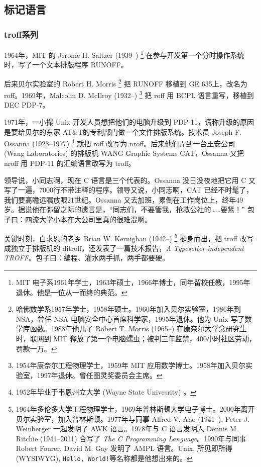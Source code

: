 \subsection{标记语言}

\subsubsection{troff系列}

1964年，MIT 的 Jerome H. Saltzer (1939--)\indexSaltzer{} \footnote{MIT 电子系1961年学士，1963年硕士，1966年博士，同年留校任教，1995年退休。他是一位从一而终的典范。} 在参与开发第一个分时操作系统时，写了一个文本排版程序 RUNOFF。

后来贝尔实验室\indexBell 的 Robert H. Morris\indexMorris{} \footnote{哈佛数学系1957年学士，1958年硕士。1960年加入贝尔实验室，1986年到 NSA，曾任 NSA 电脑安全中心首席科学家，1995年退休。他为 Unix 写了数学库函数。1988年他儿子 Robert T. Morris (1965--) 在康奈尔大学念研究生时，联网到 MIT 释放了第一个电脑蠕虫；被判三年监禁，400小时社区劳动，罚款一万。} 把 RUNOFF 移植到 GE 635上，改名为 roff。1969年，Malcolm D. McIlroy (1932--)\indexMcIlroy{} \footnote{1954年康奈尔工程物理学士，1959年 MIT 应用数学博士。1958年加入贝尔实验室，1997年退休。曾任图灵奖委员会主席。} 把 roff 用 BCPL 语言重写，移植到 DEC\indexDEC{} PDP-7。

1971年，一小撮 Unix 开发人员想把他们的电脑升级到 PDP-11，谎称升级的原因是要给贝尔的东家 AT\&T\indexATT 的专利部门做一个文件排版系统。技术员 Joseph F. Ossanna (1928--1977)\indexOssanna{} \footnote{1952年毕业于韦恩州立大学 (Wayne State Univesrity) 。} 就把 roff 改写为 nroff。后来他们弄到一台王安公司 (Wang Laboratories)\indexWangLabs{} 的排版机 WANG Graphic Systems CAT，Ossanna 又把 nroff 用 PDP-11 的汇编语言改写为 troff。

领导说，小同志啊，现在 C 语言是三个代表的。Ossanna 没日没夜地把它用 C 又写了一遍，7000行不带注释的程序。领导又说，小同志啊，CAT 已经不时髦了，我们要高瞻远瞩放眼21世纪。Ossanna 又去加班，累倒在工作岗位上，终年49岁。据说他在弥留之际的遗言是，“同志们，不要管我，抢救公社的……要紧！” 包子曰：四流大学小本在大公司里真的很难混啊。

关键时刻，白求恩的老乡 Brian W. Kernighan (1942--)\indexKernighan{} \footnote{1964年多伦多大学工程物理学士，1969年普林斯顿大学电子博士。2000年离开贝尔实验室，加入普林斯顿。1977年与同事 Alfred V. Aho (1941--), Peter J. Weinberger 一起发明了 AWK 语言。1978年与 C 语言发明人 Dennis M. Ritchie (1941--2011) 合写了 \emph{The C Programming Language}。1990年与同事 Robert Fourer, David M. Gay 发明了 AMPL 语言。Unix, 所见即所得 (WYSIWYG), \texttt{Hello, World!}等名称都是他想出来的。} 挺身而出，把 troff 改写成独立于排版机的 ditroff，还发表了一篇技术报告，\emph{A Typesetter-independent TROFF}。包子曰：编程、灌水两手抓，两手都要硬。

